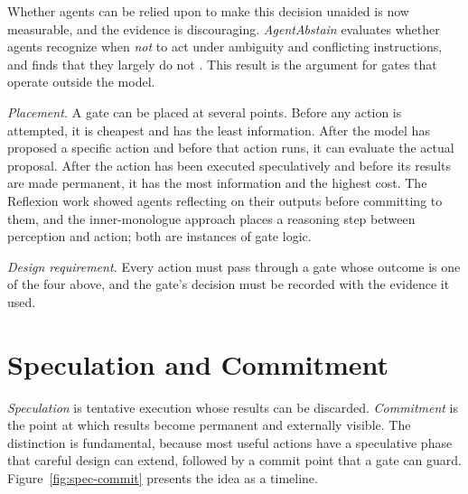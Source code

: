 \documentclass[11pt]{book}
\begin{document}
Whether agents can be relied upon to make this decision unaided is now measurable, and the evidence is discouraging. \emph{AgentAbstain} evaluates whether agents recognize when \textit{not} to act under ambiguity and conflicting instructions, and finds that they largely do not \cite{agentabstain2026}. This result is the argument for gates that operate outside the model.

\textit{Placement.} A gate can be placed at several points. Before any action is attempted, it is cheapest and has the least information. After the model has proposed a specific action and before that action runs, it can evaluate the actual proposal. After the action has been executed speculatively and before its results are made permanent, it has the most information and the highest cost. The Reflexion work \cite{shinn2023reflexion} showed agents reflecting on their outputs before committing to them, and the inner-monologue approach \cite{huang2022inner} places a reasoning step between perception and action; both are instances of gate logic.

\textit{Design requirement.} Every action must pass through a gate whose outcome is one of the four above, and the gate's decision must be recorded with the evidence it used.

\section{Speculation and Commitment}

\emph{Speculation} is tentative execution whose results can be discarded. \emph{Commitment} is the point at which results become permanent and externally visible. The distinction is fundamental, because most useful actions have a speculative phase that careful design can extend, followed by a commit point that a gate can guard. Figure~\ref{fig:spec-commit} presents the idea as a timeline.
\end{document}

